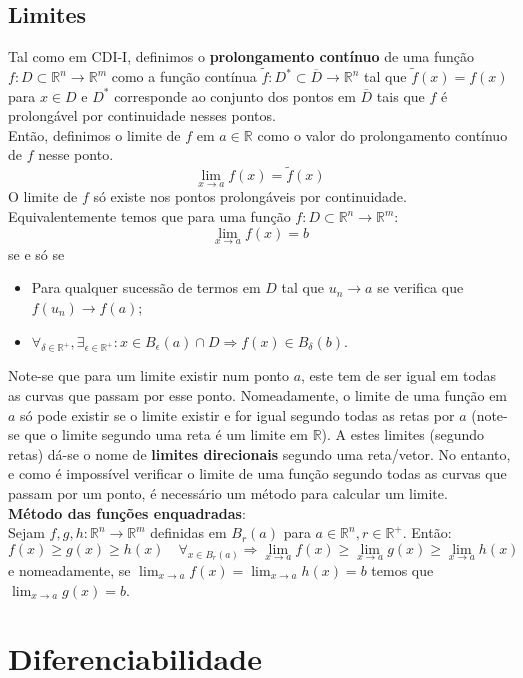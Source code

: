\documentclass{article}
\newcommand{\R}{\mathbb{R}}
\begin{document}
\subsection{Limites}
Tal como em CDI-I, definimos o \textbf{prolongamento contínuo} de uma função $f: D \subset \R^n \to \R^m$ como a função contínua $\tilde{f}: D^* \subset \overline{D} \to \R^n$ tal que $\tilde{f}(x) = f(x)$ para $x \in D$ e $D^*$ corresponde ao conjunto dos pontos em $\overline{D}$ tais que $f$ é prolongável por continuidade nesses pontos.\\
Então, definimos o limite de $f$ em $a \in \R$ como o valor do prolongamento contínuo de $f$ nesse ponto.
$$
\lim_{x \to a} f(x) = \tilde{f}(x)
$$
O limite de $f$ só existe nos pontos prolongáveis por continuidade.\\
Equivalentemente temos que para uma função $f: D \subset \R^n \to \R^m$:
$$
\lim_{x \to a} f(x) = b
$$
se e só se
\begin{itemize}
	\item Para qualquer sucessão de termos em $D$ tal que $u_n \to a$ se verifica que $f(u_n) \to f(a)$;
	\item $\forall_{\delta \in \R^+}, \exists_{\epsilon \in \R^+}: x \in B_\epsilon(a) \cap D \Rightarrow f(x) \in B_\delta(b)$.
\end{itemize}
Note-se que para um limite existir num ponto $a$, este tem de ser igual em todas as curvas que passam por esse ponto. Nomeadamente, o limite de uma função em $a$ só pode existir se o limite existir e for igual segundo todas as retas por $a$ (note-se que o limite segundo uma reta é um limite em $\R$). A estes limites (segundo retas) dá-se o nome de \textbf{limites direcionais} segundo uma reta/vetor.
No entanto, e como é impossível verificar o limite de uma função segundo todas as curvas que passam por um ponto, é necessário um método para calcular um limite.\\
\textbf{Método das funções enquadradas}:\\
Sejam $f,g,h: \R^n \to \R^m$ definidas em $B_r(a)$ para $a \in \R^n, r \in \R^+$. Então:
$$
f(x) \geq g(x) \geq h(x) \quad \forall_{x \in B_r(a)} \Rightarrow \lim_{x \to a} f(x) \geq \lim_{x \to a} g(x) \geq \lim_{x \to a} h(x) 
$$
e nomeadamente, se $\lim_{x \to a} f(x) = \lim_{x \to a} h(x) = b$ temos que $\lim_{x \to a} g(x) = b$.

\section{Diferenciabilidade}
\end{document}

